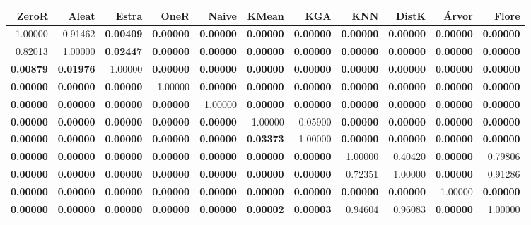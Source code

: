 \begin{table}
\centering
\label{Digitsteste_pareado_table}
\begin{tabular}{rrrrrrrrrrr}
\toprule
           ZeroR &            Aleat &            Estra &            OneR  &            Naive &            KMean &              KGA &              KNN &            DistK &            Árvor &            Flore \\
\midrule
         1.00000 &          0.91462 & \textbf{0.00409} & \textbf{0.00000} & \textbf{0.00000} & \textbf{0.00000} & \textbf{0.00000} & \textbf{0.00000} & \textbf{0.00000} & \textbf{0.00000} & \textbf{0.00000} \\
         0.82013 &          1.00000 & \textbf{0.02447} & \textbf{0.00000} & \textbf{0.00000} & \textbf{0.00000} & \textbf{0.00000} & \textbf{0.00000} & \textbf{0.00000} & \textbf{0.00000} & \textbf{0.00000} \\
\textbf{0.00879} & \textbf{0.01976} &          1.00000 & \textbf{0.00000} & \textbf{0.00000} & \textbf{0.00000} & \textbf{0.00000} & \textbf{0.00000} & \textbf{0.00000} & \textbf{0.00000} & \textbf{0.00000} \\
\textbf{0.00000} & \textbf{0.00000} & \textbf{0.00000} &          1.00000 & \textbf{0.00000} & \textbf{0.00000} & \textbf{0.00000} & \textbf{0.00000} & \textbf{0.00000} & \textbf{0.00000} & \textbf{0.00000} \\
\textbf{0.00000} & \textbf{0.00000} & \textbf{0.00000} & \textbf{0.00000} &          1.00000 & \textbf{0.00000} & \textbf{0.00000} & \textbf{0.00000} & \textbf{0.00000} & \textbf{0.00000} & \textbf{0.00000} \\
\textbf{0.00000} & \textbf{0.00000} & \textbf{0.00000} & \textbf{0.00000} & \textbf{0.00000} &          1.00000 &          0.05900 & \textbf{0.00000} & \textbf{0.00000} & \textbf{0.00000} & \textbf{0.00000} \\
\textbf{0.00000} & \textbf{0.00000} & \textbf{0.00000} & \textbf{0.00000} & \textbf{0.00000} & \textbf{0.03373} &          1.00000 & \textbf{0.00000} & \textbf{0.00000} & \textbf{0.00000} & \textbf{0.00000} \\
\textbf{0.00000} & \textbf{0.00000} & \textbf{0.00000} & \textbf{0.00000} & \textbf{0.00000} & \textbf{0.00000} & \textbf{0.00000} &          1.00000 &          0.40420 & \textbf{0.00000} &          0.79806 \\
\textbf{0.00000} & \textbf{0.00000} & \textbf{0.00000} & \textbf{0.00000} & \textbf{0.00000} & \textbf{0.00000} & \textbf{0.00000} &          0.72351 &          1.00000 & \textbf{0.00000} &          0.91286 \\
\textbf{0.00000} & \textbf{0.00000} & \textbf{0.00000} & \textbf{0.00000} & \textbf{0.00000} & \textbf{0.00000} & \textbf{0.00000} & \textbf{0.00000} & \textbf{0.00000} &          1.00000 & \textbf{0.00000} \\
\textbf{0.00000} & \textbf{0.00000} & \textbf{0.00000} & \textbf{0.00000} & \textbf{0.00000} & \textbf{0.00002} & \textbf{0.00003} &          0.94604 &          0.96083 & \textbf{0.00000} &          1.00000 \\
\bottomrule
\end{tabular}
\end{table}
